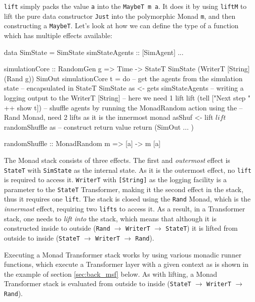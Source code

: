 \texttt{lift} simply packs the value \texttt{a} into the \texttt{MaybeT m a}. It does it by using \texttt{liftM} to lift the pure data constructor \texttt{Just} into the polymorphic Monad \texttt{m}, and then constructing a \texttt{MaybeT}. Let's look at how we can define the type of a function which has multiple effects available:

\begin{HaskellCode}
data SimState = SimState { simStateAgents :: [SimAgent] ... }

simulationCore :: RandomGen g 
               => Time
               -> StateT SimState (WriterT [String] (Rand g)) SimOut
simulationCore t = do
  -- get the agents from the simulation state 
  -- encapsulated in StateT SimState
  as <- gets simStateAgents
  -- writing a logging output to the WriterT [String]
  -- here we need 1 lift 
  lift (tell ["Next step " ++ show t])
  -- shuffle agents by running the MonadRandom action using the
  -- Rand Monad, need 2 lifts as it is the innermost monad
  asShuf <- lift $ lift $ randomShuffle as
  -- construct return value
  return (SimOut { ... })
  
randomShuffle :: MonadRandom m => [a] -> m [a]
\end{HaskellCode}

The Monad stack consists of three effects. The first and \textit{outermost} effect is \texttt{StateT} with \texttt{SimState} as the internal state. As it is the outermost effect, no \texttt{lift} is required to access it. \texttt{WriterT} with \texttt{[String]} as the logging facility is a parameter to the \texttt{StateT} Transformer, making it the second effect in the stack, thus it requires one \texttt{lift}. The stack is closed using the \texttt{Rand} Monad, which is the \textit{innermost} effect, requiring two \texttt{lifts} to access it. As a result, in a Transformer stack, one needs to \textit{lift into} the stack, which means that although it is constructed inside to outside (\texttt{Rand} $\rightarrow$ \texttt{WriterT} $\rightarrow$ \texttt{StateT}) it is lifted from outside to inside (\texttt{StateT} $\rightarrow$ \texttt{WriterT} $\rightarrow$ \texttt{Rand}).

Executing a Monad Transformer stack works by using various monadic runner functions, which execute a Transformer layer with a given context as is shown in the example of section \ref{sec:back_msf} below. As with lifting, a Monad Transformer stack is evaluated from outside to inside (\texttt{StateT} $\rightarrow$ \texttt{WriterT} $\rightarrow$ \texttt{Rand}).

